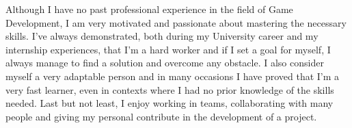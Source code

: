 \begin{cvletter}
      Although I have no past professional experience in the field of Game Development, I am very motivated and passionate about mastering the necessary skills. I've always demonstrated, both during my University career and my internship experiences, that I'm a hard worker and if I set a goal for myself, I always manage to find a solution and overcome any obstacle. I also consider myself a very adaptable person and in many occasions I have proved that I'm a very fast learner, even in contexts where I had no prior knowledge of the skills needed. Last but not least, I enjoy working in teams, collaborating with many people and giving my personal contribute in the development of a project.
  \end{cvletter}
  
  \makeletterclosing

